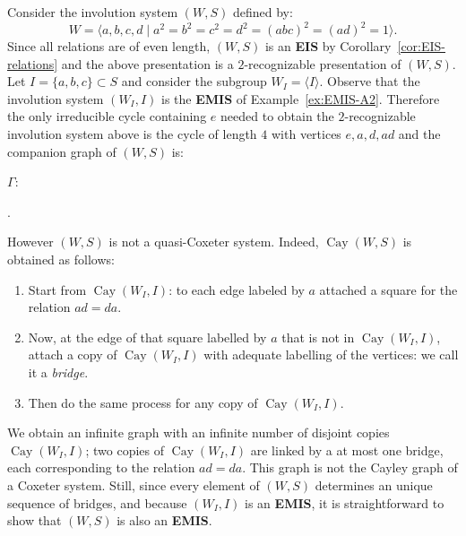\documentclass[A4paper, oneside]{amsart}
\newcommand{\id}{\textit{e}}
\newcommand{\Cay}{\operatorname{Cay}}
\newcommand{\EIS}{\textnormal{\bf EIS}\xspace}
\newcommand{\EMIS}{\textnormal{\bf EMIS}\xspace}
\theoremstyle{definition}
\begin{document}
Consider the involution system $(W,S)$ defined by:
$$
W = \langle a,b,c,d \mid a^2=b^2=c^2=d^2 =(abc)^2=(ad)^2=1\rangle.
$$
Since all relations are of even length, $(W,S)$ is an \EIS by Corollary~\ref{cor:EIS-relations} and the above presentation is a $2$-recognizable presentation of $(W,S)$. 
Let $I=\{a,b,c\}\subset S$ and consider the subgroup $W_I=\langle I\rangle$.  Observe that the involution system $(W_I,I)$ is the \EMIS of Example~\ref{ex:EMIS-A2}. Therefore the only irreducible cycle containing $\id$ needed to obtain the $2$-recognizable involution system above is the cycle of length $4$ with vertices $\id, a,d,ad$ and the companion graph of $(W,S)$ is:
\begin{center}
$\Gamma:$ \hskip 1cm
.
\end{center}

\noindent However $(W,S)$ is not a quasi-Coxeter system. Indeed, $\Cay(W,S)$ is obtained as follows:
\begin{enumerate}
\item Start from $\Cay(W_I,I)$: to each edge labeled by $a$ attached a square for the relation $ad=da$. 
\item Now, at the edge of that square labelled by $a$ that is not in $\Cay(W_I,I)$, attach a copy of $\Cay(W_I,I)$ with adequate labelling of the vertices: we call it a {\em bridge}. 
\item Then do the same process for any copy of $\Cay(W_I,I)$.
\end{enumerate} 
We obtain an infinite graph with an infinite number of disjoint copies $\Cay(W_I,I)$; two copies of $\Cay(W_I,I)$ are linked by a at most one bridge, each corresponding to the relation $ad=da$. This graph is not the Cayley graph of a Coxeter system. Still, since every element of $(W,S)$ determines an unique sequence of bridges, and because $(W_I, I)$ is an \EMIS, it is straightforward to show that $(W,S)$ is also an \EMIS. 
\end{document}
